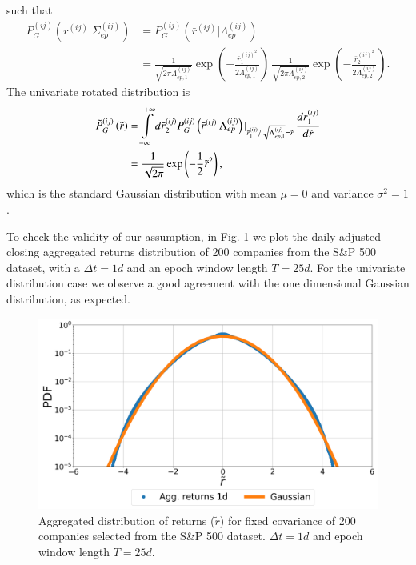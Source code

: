 such that
\begin{align}
    P_{G}^{\left(ij\right)}\left(r^{\left(ij\right)}|
    \Sigma_{ep}^{\left(ij\right)}\right)
    &=P_{G}^{\left(ij\right)}\left(\bar{r}^{\left(ij\right)}|
    \Lambda_{ep}^{\left(ij\right)}\right)\\
    &=\frac{1}{\sqrt{2\pi\Lambda_{ep,1}^{\left(ij\right)}}}
    \exp\left(-\frac{\bar{r}_{1}^{\left(ij\right)^{2}}}{2\Lambda_{ep,1}
    ^{\left(ij\right)}}\right)
    \,\frac{1}{\sqrt{2\pi\Lambda_{ep,2}^{\left(ij\right)}}}
    \exp\left(-\frac{\bar{r}_{2}^{\left(ij\right)^{2}}}{2\Lambda_{ep,2}
    ^{\left(ij\right)}}\right).
\end{align}
The univariate rotated distribution is
\begin{align}
    \tilde{P}_{G}^{\left(ij\right)}\left(\tilde{r}\right)
    &=\intop_{-\infty}^{+\infty}d\bar{r}_{2}^{\left(ij\right)}
    P_{G}^{\left(ij\right)}\left(\bar{r}^{\left(ij\right)}|
    \Lambda_{ep}^{\left(ij\right)}\right)\vert_{\bar{r}_{1}^{\left(ij\right)}/
    \sqrt{\Lambda_{ep,1}^{\left(ij\right)}}=\tilde{r}}\,
    \frac{d\bar{r}_{1}^{\left(ij\right)}}{d\tilde{r}}\\
    & =\frac{1}{\sqrt{2\pi}}\exp\left(-\frac{1}{2}\tilde{r}^{2}\right),
\end{align}
which is the standard Gaussian distribution with mean $\mu = 0$ and variance
$\sigma^2 = 1$.

To check the validity of our assumption, in Fig.
\ref{fig:gaussian_agg_returns_epoch} we plot the daily adjusted closing
aggregated returns distribution of 200 companies from the S\&P 500 dataset,
with a $\Delta t = 1d$ and an epoch window length $T = 25d$. For the
univariate distribution case we observe a good agreement with the one
dimensional Gaussian distribution, as expected.

\begin{figure}[htbp]
    \centering
    \includegraphics[width=0.6\columnwidth]
    {figures/05_gaussian_agg_returns_short_epoch.png}
    \caption{Aggregated distribution of returns ($\tilde{r}$) for fixed
             covariance of 200 companies selected from the S\&P 500
             dataset. $\Delta t = 1d$ and epoch window length $T=25d$.}
    \label{fig:gaussian_agg_returns_epoch}
\end{figure}


